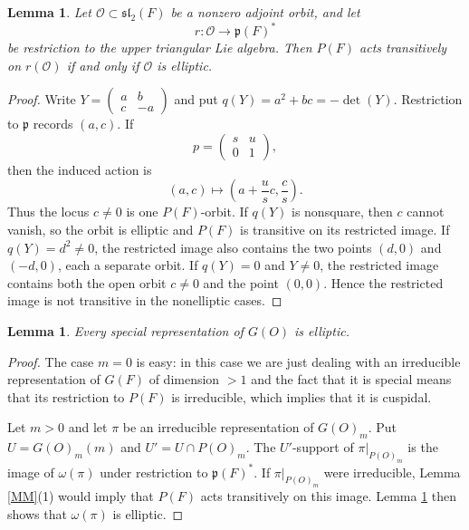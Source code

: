 \documentclass[11pt,a4paper,twoside]{amsart}
\newtheorem{lemma}[theorem]{Lemma}
\theoremstyle{definition}
\theoremstyle{remark}
\newcommand{\bo}{\omega}
\newcommand{\mcO}{\mathcal O}
\begin{document}
\begin{lemma}\label{orbit-image}
Let $\mcO\subset\mathfrak{sl}_2(F)$ be a nonzero adjoint orbit, and let
$$
r:\mcO\longrightarrow\mathfrak p(F)^*
$$
be restriction to the upper triangular Lie algebra. Then $P(F)$ acts transitively on $r(\mcO)$ if and only if $\mcO$ is elliptic.
\end{lemma}
\begin{proof}
Write $Y=\begin{pmatrix}a&b\\c&-a\end{pmatrix}$ and put $q(Y)=a^2+bc=-\det(Y)$. Restriction to $\mathfrak p$ records $(a,c)$. If
$$
p=\begin{pmatrix}s&u\\0&1\end{pmatrix},
$$
then the induced action is
$$
(a,c)\longmapsto\left(a+\frac{u}{s}c,\frac{c}{s}\right).
$$
Thus the locus $c\neq0$ is one $P(F)$-orbit. If $q(Y)$ is nonsquare, then $c$ cannot vanish, so the orbit is elliptic and $P(F)$ is transitive on its restricted image. If $q(Y)=d^2\neq0$, the restricted image also contains the two points $(d,0)$ and $(-d,0)$, each a separate orbit. If $q(Y)=0$ and $Y\neq0$, the restricted image contains both the open orbit $c\neq0$ and the point $(0,0)$. Hence the restricted image is not transitive in the nonelliptic cases.
\end{proof}
\begin{lemma}\label{GO-special-elliptic}
Every special representation of $G(O)$ is elliptic.
\end{lemma}
\begin{proof}
The case $m=0$ is easy: in this case we are just dealing with an irreducible representation of $G(F)$ of dimension $>1$ and the fact that it is special means that its restriction to $P(F)$ is irreducible, which implies that it is cuspidal.

Let $m>0$ and let $\pi$ be an irreducible representation of $G(O)_m$. Put $U=G(O)_m(m)$ and $U'=U\cap P(O)_m$. The $U'$-support of $\pi|_{P(O)_m}$ is the image of $\bo(\pi)$ under restriction to $\mathfrak p(F)^*$. If $\pi|_{P(O)_m}$ were irreducible, Lemma \ref{MM}(1) would imply that $P(F)$ acts transitively on this image. Lemma \ref{orbit-image} then shows that $\bo(\pi)$ is elliptic.
\end{proof}
\end{document}
